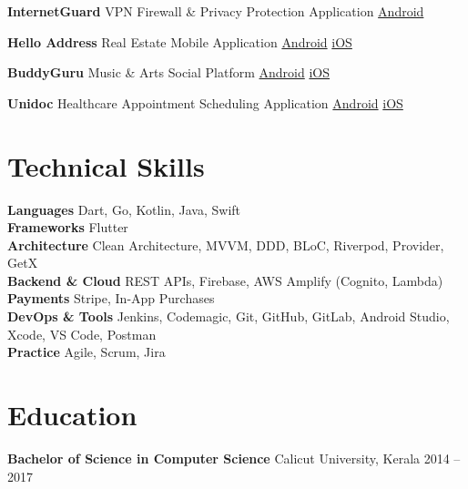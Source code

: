 \documentclass[letterpaper,10pt]{article}
\newcommand{\project}[2]{
  \noindent\textbf{#1} \hspace{2pt}\textemdash\hspace{2pt} #2
  \vspace{1pt}
}
\begin{document}
\project{InternetGuard}{VPN Firewall \& Privacy Protection Application \quad \textcolor{blue}{\href{https://play.google.com/store/apps/details?id=com.js.internetguard}{Android}}}

\project{Hello Address}{Real Estate Mobile Application \quad \textcolor{blue}{\href{https://play.google.com/store/apps/details?id=com.manorama.helloaddress}{Android}} \quad \textcolor{blue}{\href{https://apps.apple.com/in/app/hello-address/id965147046}{iOS}}}

\project{BuddyGuru}{Music \& Arts Social Platform \quad \textcolor{blue}{\href{https://play.google.com/store/apps/details?id=ai.buddyguru.app}{Android}} \quad \textcolor{blue}{\href{https://apps.apple.com/in/app/buddyguru-learn-collab-earn/id6465898281}{iOS}}}

\project{Unidoc}{Healthcare Appointment Scheduling Application \quad \textcolor{blue}{\href{https://play.google.com/store/apps/details?id=com.ae.unidoc}{Android}} \quad \textcolor{blue}{\href{https://apps.apple.com/in/app/unidoc-doctor-appointment/id1527263282}{iOS}}}

\section*{Technical Skills}
\vspace{2pt}
\noindent
\textbf{Languages} \quad Dart, Go, Kotlin, Java, Swift \\
\textbf{Frameworks} \quad Flutter \\
\textbf{Architecture} \quad Clean Architecture, MVVM, DDD, BLoC, Riverpod, Provider, GetX \\
\textbf{Backend \& Cloud} \quad REST APIs, Firebase, AWS Amplify (Cognito, Lambda) \\
\textbf{Payments} \quad Stripe, In-App Purchases \\
\textbf{DevOps \& Tools} \quad Jenkins, Codemagic, Git, GitHub, GitLab, Android Studio, Xcode, VS Code, Postman \\
\textbf{Practice} \quad Agile, Scrum, Jira

\section*{Education}
\vspace{2pt}
\noindent\textbf{Bachelor of Science in Computer Science} \hspace{2pt}\textemdash\hspace{2pt} Calicut University, Kerala \hfill 2014 -- 2017
\end{document}
